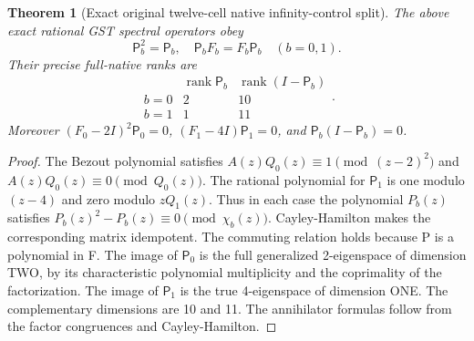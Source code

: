 \documentclass{article}
\newtheorem{theorem}{Theorem}
\begin{document}
\begin{theorem}[Exact original twelve-cell native infinity-control split]
The above exact rational GST spectral operators obey
\[
\boxed{
\mathsf P_b^2=\mathsf P_b,\quad
\mathsf P_bF_b=F_b\mathsf P_b
\quad(b=0,1).
}
\]
Their precise full-native ranks are
\[
\boxed{
\begin{array}{c|cc}
&\operatorname{rank}\mathsf P_b&
 \operatorname{rank}(I-\mathsf P_b)\\ \hline
b=0&2&10\\
b=1&1&11
\end{array}.}
\]
Moreover
$(F_0-2I)^2\mathsf P_0=0$,
$(F_1-4I)\mathsf P_1=0$,
and $\mathsf P_b(I-\mathsf P_b)=0$.
\end{theorem}
\begin{proof}
The Bezout polynomial satisfies
$A(z)Q_0(z)\equiv1\pmod{(z-2)^2}$
and $A(z)Q_0(z)\equiv0\pmod{Q_0(z)}$.
The rational polynomial for $\mathsf P_1$ is
one modulo $(z-4)$ and zero modulo $zQ_1(z)$.
Thus in each case the polynomial $P_b(z)$ satisfies
$P_b(z)^2-P_b(z)\equiv0\pmod{\chi_b(z)}$.
Cayley-Hamilton makes the corresponding
matrix idempotent. The commuting relation
holds because P is a polynomial in F.
The image of $\mathsf P_0$ is the full
generalized 2-eigenspace of dimension TWO,
by its characteristic polynomial multiplicity
and the coprimality of the factorization.
The image of $\mathsf P_1$ is the true
4-eigenspace of dimension ONE.
The complementary dimensions are 10 and 11.
The annihilator formulas follow from the factor
congruences and Cayley-Hamilton.
\end{proof}
\end{document}
